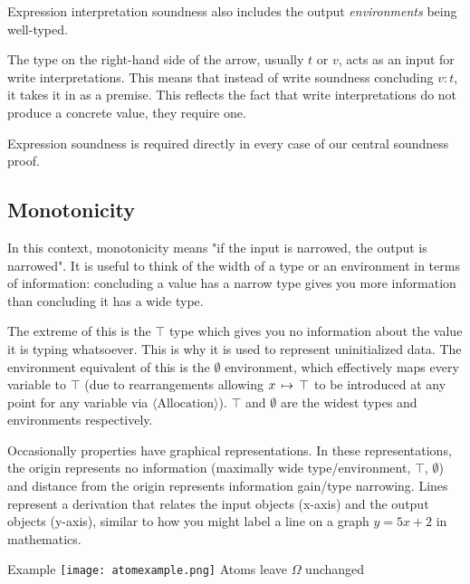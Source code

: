 \documentclass[12pt,twoside]{report}
\begin{document}
Expression interpretation soundness also includes the output \textit{environments} being well-typed.

The type on the right-hand side of the arrow, usually $t$ or $v$, acts as an input for write interpretations. This means that instead of write soundness concluding $v:t$, it takes it in as a premise. This reflects the fact that write interpretations do not produce a concrete value, they require one.

Expression soundness is required directly in every case of our central soundness proof.

\subsection{Monotonicity}
In this context, monotonicity means "if the input is narrowed, the output is narrowed". It is useful to think of the width of a type or an environment in terms of information: concluding a value has a narrow type gives you more information than concluding it has a wide type.

The extreme of this is the $\top$ type which gives you no information about the value it is typing whatsoever. This is why it is used to represent uninitialized data. The environment equivalent of this is the $\emptyset$ environment, which effectively maps every variable to $\top$ (due to rearrangements allowing $x \, \mapsto \, \top$ to be introduced at any point for any variable via $\langle\text{Allocation}\rangle$). $\top$ and $\emptyset$ are the widest types and environments respectively.

\noindent
\begin{minipage}{0.6\textwidth}
  \hspace{2.25ex} Occasionally properties have graphical representations. In these representations, the origin represents no information (maximally wide type/environment, $\top$, $\emptyset$) and distance from the origin represents information gain/type narrowing. Lines represent a derivation that relates the input objects (x-axis) and the output objects (y-axis), similar to how you might label a line on a graph $y = 5x + 2$ in mathematics.
\end{minipage}
\begin{minipage}{0.4\textwidth}
  \centering
  Example
  \texttt{[image: atomexample.png]}
  Atoms leave $\Omega$ unchanged
\end{minipage}
\end{document}
